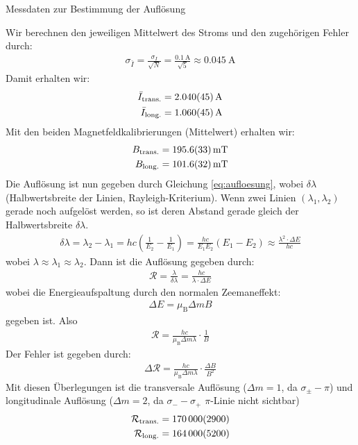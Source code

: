 \documentclass[11pt, a4paper]{article}
\begin{document}
\begin{table}[h]
	\centering
	
	\caption{Messdaten zur Bestimmung der Auflösung}
	\label{tab:aufloesung}
\end{table}
Wir berechnen den jeweiligen Mittelwert des Stroms und den zugehörigen Fehler durch:
\begin{align}
	\sigma_{\bar{I}} = \frac{\sigma_I}{\sqrt{N}} = \frac{\SI{0,1}{\ampere}}{\sqrt{5}} \approx \SI{0,045}{\ampere}
\end{align}
Damit erhalten wir:
\begin{align}
	\bar{I}_\mathrm{trans.} = \SI{2.040 +- 0.045}{\ampere} \\
	\bar{I}_\mathrm{long.} = \SI{1.060 +- 0.045}{\ampere}
\end{align}
Mit den beiden Magnetfeldkalibrierungen (Mittelwert) erhalten wir:
\begin{align}
	B_\mathrm{trans.} = \SI{195.6 +- 3.3}{\milli\tesla} \\
	B_\mathrm{long.} = \SI{101.6 +- 3.2}{\milli\tesla}
\end{align}
Die Auflösung ist nun gegeben durch Gleichung \ref{eq:aufloesung}, wobei $\delta \lambda$ (Halbwertsbreite der Linien, Rayleigh-Kriterium).
Wenn zwei Linien $(\lambda_1, \lambda_2)$ gerade noch aufgelöst werden, so ist deren Abstand gerade gleich der Halbwertsbreite $\delta \lambda$.
\begin{align}
	\delta \lambda = \lambda_2 - \lambda_1 = h c \left( \frac{1}{E_2} - \frac{1}{E_1} \right) = \frac{h c}{E_1 E_2} \left(E_1 - E_2\right) \approx \frac{\lambda^2 \cdot \Delta E}{h c}
\end{align}
wobei $\lambda \approx \lambda_1 \approx \lambda_2$.
Dann ist die Auflösung gegeben durch:
\begin{align}
	\mathcal{R} = \frac{\lambda}{\delta \lambda} = \frac{h c}{\lambda \cdot \Delta E}
\end{align}
wobei die Energieaufspaltung durch den normalen Zeemaneffekt:
\begin{align}
	\Delta E = \mu_\mathrm{B} \Delta m B
\end{align}
gegeben ist.
Also
\begin{align}
	\mathcal{R} = \frac{h c}{ \mu_\mathrm{B} \Delta m \lambda} \cdot \frac{1}{B} 
\end{align}
Der Fehler ist gegeben durch:
\begin{align}
	\Delta \mathcal{R} = \frac{h c}{ \mu_\mathrm{B} \Delta m \lambda} \cdot \frac{\Delta B}{B^2}
\end{align}
Mit diesen Überlegungen ist die transversale Auflösung ($\Delta m = 1$, da $\sigma_{\pm} - \pi$) und longitudinale Auflösung ($\Delta m = 2$, da $\sigma_{-} - \sigma_{+}$ $\pi$-Linie nicht sichtbar)
\begin{align}
	\mathcal{R}_\mathrm{trans.} = \num{170000 +- 2900} \\
	\mathcal{R}_\mathrm{long.} =\num{164000 +- 5200}
\end{align}
\end{document}
